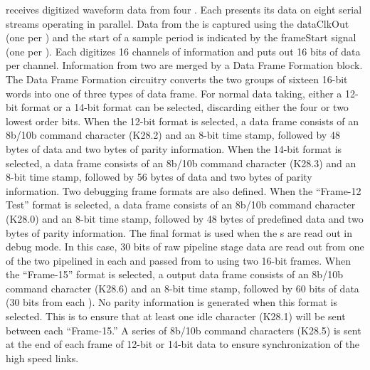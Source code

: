  receives digitized waveform data from 
four  . Each  presents its data on eight 
serial streams operating in parallel. Data from the  is captured 
using the  dataClkOut (one per ) and the start of a 
sample period is indicated by the frameStart signal (one per ). 
Each  digitizes \num{16} channels of information and puts out \num{16} bits 
of data per channel. Information from two  are merged by a Data 
Frame Formation block. The Data Frame Formation circuitry converts the two 
groups of sixteen \num{16}-bit words into one of three types of data frame. For normal 
data taking, either a \num{12}-bit format or a \num{14}-bit  format can be 
selected, discarding either the four or two lowest order bits. When the 
\num{12}-bit format is selected, a data frame consists of an 8b/10b command 
character (K28.2) and an \num{8}-bit time stamp, followed by \num{48} bytes of  
data and two bytes of parity information. When the \num{14}-bit format is selected, 
a data frame consists of an 8b/10b command character (K28.3) and an \num{8}-bit time 
stamp, followed by \num{56} bytes of  data and two bytes of parity 
information. Two debugging frame formats are also defined. When the ``Frame-12 Test'' 
format is selected, a data frame consists of an 8b/10b command character 
(K28.0) and an \num{8}-bit time stamp, followed by \num{48} bytes of predefined data 
and two bytes of parity information. The final format is used when the 
s are read out in debug mode. In this case, \num{30} bits of raw 
pipeline stage data are read out from one of the two pipelined  
in each   and passed from  to 
 using two \num{16}-bit frames. When the ``Frame-15'' format is 
selected, a  output data frame consists of an 8b/10b command 
character (K28.6) and an 8-bit time stamp, followed by \num{60} bits of  
data (\num{30} bits from each ). No parity information is generated 
when this format is selected. This is to ensure that at least one idle 
character (K28.1) will be sent between each ``Frame-15.'' A series of 8b/10b 
command characters (K28.5) is sent at the end of each frame of \num{12}-bit or 
\num{14}-bit data to ensure synchronization of the high speed links.

